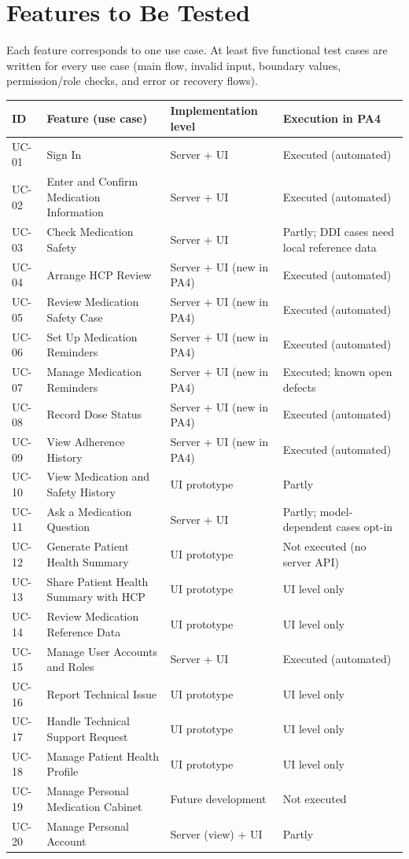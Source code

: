 \documentclass[10pt,letterpaper]{article}
\begin{document}
\section{Features to Be Tested}
Each feature corresponds to one use case. At least five functional test cases are written for every use case
(main flow, invalid input, boundary values, permission/role checks, and error or recovery flows).
\begin{longtable}{|L{1.35cm}|L{5.4cm}|L{4.1cm}|L{4.2cm}|}
\hline \textbf{ID} & \textbf{Feature (use case)} & \textbf{Implementation level} & \textbf{Execution in PA4}\\ \hline \endhead
UC-01 & Sign In & Server + UI & Executed (automated)\\ \hline
UC-02 & Enter and Confirm Medication Information & Server + UI & Executed (automated)\\ \hline
UC-03 & Check Medication Safety & Server + UI & Partly; DDI cases need local reference data\\ \hline
UC-04 & Arrange HCP Review & Server + UI (new in PA4) & Executed (automated)\\ \hline
UC-05 & Review Medication Safety Case & Server + UI (new in PA4) & Executed (automated)\\ \hline
UC-06 & Set Up Medication Reminders & Server + UI (new in PA4) & Executed (automated)\\ \hline
UC-07 & Manage Medication Reminders & Server + UI (new in PA4) & Executed; known open defects\\ \hline
UC-08 & Record Dose Status & Server + UI (new in PA4) & Executed (automated)\\ \hline
UC-09 & View Adherence History & Server + UI (new in PA4) & Executed (automated)\\ \hline
UC-10 & View Medication and Safety History & UI prototype & Partly\\ \hline
UC-11 & Ask a Medication Question & Server + UI & Partly; model-dependent cases opt-in\\ \hline
UC-12 & Generate Patient Health Summary & UI prototype & Not executed (no server API)\\ \hline
UC-13 & Share Patient Health Summary with HCP & UI prototype & UI level only\\ \hline
UC-14 & Review Medication Reference Data & UI prototype & UI level only\\ \hline
UC-15 & Manage User Accounts and Roles & Server + UI & Executed (automated)\\ \hline
UC-16 & Report Technical Issue & UI prototype & UI level only\\ \hline
UC-17 & Handle Technical Support Request & UI prototype & UI level only\\ \hline
UC-18 & Manage Patient Health Profile & UI prototype & UI level only\\ \hline
UC-19 & Manage Personal Medication Cabinet & Future development & Not executed\\ \hline
UC-20 & Manage Personal Account & Server (view) + UI & Partly\\ \hline
\end{longtable}
\end{document}

